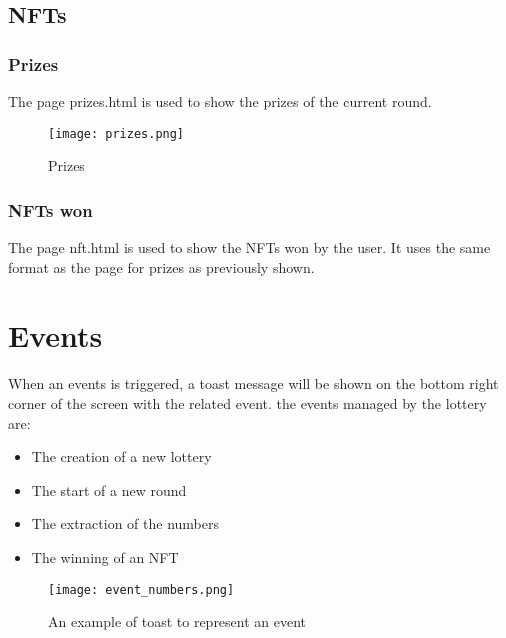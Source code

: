 \documentclass[11pt]{article}
\begin{document}
\subsection{NFTs}
\subsubsection{Prizes}
The page prizes.html is used to show the prizes of the current round.
\begin{figure}[h!]
\centering
\texttt{[image: prizes.png]}
\caption{Prizes}
\label{fig:prizes}
\end{figure}

\subsubsection{NFTs won}
The page nft.html is used to show the NFTs won by the user. It uses the
same format as the page for prizes as previously shown.
\section{Events}
When an events is triggered, a toast message will be shown on the bottom right corner of the screen
with the related event.
the events managed by the lottery are:
\begin{itemize}
\item The creation of a new lottery
\item The start of a new round
\item The extraction of the numbers
\item The winning of an NFT
\end{itemize}
\begin{figure}[h!]
\centering
\texttt{[image: event\_numbers.png]}
\caption{An example of toast to represent an event}
\label{fig:events}

\end{figure}
\end{document}
